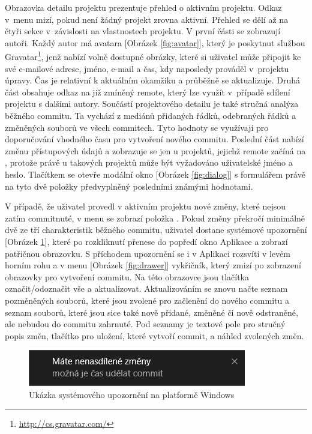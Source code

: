 Obrazovka detailu projektu prezentuje přehled o aktivním projektu. Odkaz v~menu mizí, pokud není žádný projekt zrovna aktivní. Přehled se dělí až na čtyři sekce v~závislosti na vlastnostech projektu. V první části se zobrazují autoři. Každý autor má avatara [Obrázek \ref{fig:avatar}], který je poskytnut službou Gravatar\footnote{\url{http://cs.gravatar.com/}}, jenž nabízí volně dostupné obrázky, které si uživatel může připojit ke své e-mailové adrese, jméno, e-mail a čas, kdy naposledy prováděl v~projektu úpravy. Čas je relativní k aktuálním okamžiku a průběžně se aktualizuje. Druhá část obsahuje odkaz na již zmíněný remote, který lze využít v~případě sdílení projektu s dalšími autory. Součástí projektového detailu je také stručná analýza běžného commitu. Ta vychází z mediánů přidaných řádků, odebraných řádků a změněných souborů ve všech commitech. Tyto hodnoty se využívají pro doporučování vhodného času pro vytvoření nového commitu. Poslední část nabízí změnu přístupových údajů a zobrazuje se jen u projektů, jejichž remote začíná na , protože právě u takových projektů může být vyžadováno uživatelské jméno a heslo. Tlačítkem  se otevře modální okno [Obrázek \ref{fig:dialog}] s formulářem právě na tyto dvě položky předvyplněný posledními známými hodnotami.

V případě, že uživatel provedl v aktivním projektu nové změny, které nejsou zatím commitnuté, v menu se zobrazí položka . Pokud změny překročí minimálně dvě ze tří charakteristik běžného commitu, uživatel dostane systémové upozornění [Obrázek \ref{fig:notification}], které po rozkliknutí přenese do popředí okno Aplikace a zobrazí patřičnou obrazovku. S příchodem upozornění se i v Aplikaci rozsvítí v levém horním rohu a v menu [Obrázek \ref{fig:drawer}] vykřičník, který zmizí po zobrazení obrazovky pro vytvoření commitu. Na této obrazovce jsou tlačítka označit/odoznačit vše a aktualizovat. Aktualizováním se znovu načte seznam pozměněných souborů, které jsou zvolené pro začlenění do nového commitu a seznam souborů, které jsou sice také nově přidané, změněné či nově odstraněné, ale nebudou do commitu zahrnuté. Pod seznamy je textové pole pro stručný popis změn, tlačítko pro uložení, které vytvoří commit, a náhled zvolených změn.

\FloatBarrier
\begin{figure}[ht]
	\centering
	\includegraphics[scale=0.65]{sections/ui/images/notification.png}
	\caption[Systémové upozornění]{Ukázka systémového upozornění na platformě Windows}
	\label{fig:notification}
\end{figure}
\FloatBarrier

